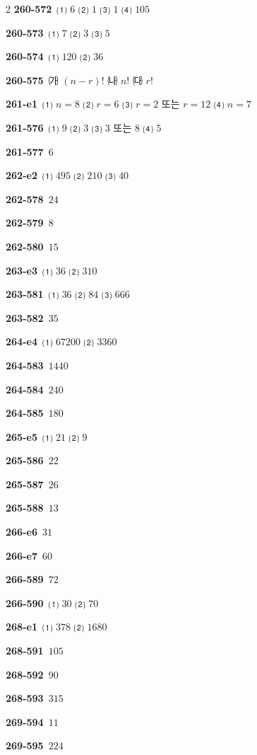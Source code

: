 \documentclass[10pt,a4paper]{article}
\begin{document}
\begin{multicols}{2}
\noindent\textbf{260-572}\ ⑴ $6$ ⑵ $1$ ⑶ $1$ ⑷ $105$\par
\noindent\textbf{260-573}\ ⑴ $7$ ⑵ $3$ ⑶ $5$\par
\noindent\textbf{260-574}\ ⑴ $120$ ⑵ $36$\par
\noindent\textbf{260-575}\ ㈎ $(n-r)!$ ㈏ $n!$ ㈐ $r!$\par
\noindent\textbf{261-e1}\ ⑴ $n=8$ ⑵ $r=6$ ⑶ $r=2$ 또는 $r=12$ ⑷ $n=7$\par
\noindent\textbf{261-576}\ ⑴ $9$ ⑵ $3$ ⑶ $3$ 또는 $8$ ⑷ $5$\par
\noindent\textbf{261-577}\ $6$\par
\noindent\textbf{262-e2}\ ⑴ $495$ ⑵ $210$ ⑶ $40$\par
\noindent\textbf{262-578}\ $24$\par
\noindent\textbf{262-579}\ $8$\par
\noindent\textbf{262-580}\ $15$\par
\noindent\textbf{263-e3}\ ⑴ $36$ ⑵ $310$\par
\noindent\textbf{263-581}\ ⑴ $36$ ⑵ $84$ ⑶ $666$\par
\noindent\textbf{263-582}\ $35$\par
\noindent\textbf{264-e4}\ ⑴ $67200$ ⑵ $3360$\par
\noindent\textbf{264-583}\ $1440$\par
\noindent\textbf{264-584}\ $240$\par
\noindent\textbf{264-585}\ $180$\par
\noindent\textbf{265-e5}\ ⑴ $21$ ⑵ $9$\par
\noindent\textbf{265-586}\ $22$\par
\noindent\textbf{265-587}\ $26$\par
\noindent\textbf{265-588}\ $13$\par
\noindent\textbf{266-e6}\ $31$\par
\noindent\textbf{266-e7}\ $60$\par
\noindent\textbf{266-589}\ $72$\par
\noindent\textbf{266-590}\ ⑴ $30$ ⑵ $70$\par
\noindent\textbf{268-e1}\ ⑴ $378$ ⑵ $1680$\par
\noindent\textbf{268-591}\ $105$\par
\noindent\textbf{268-592}\ $90$\par
\noindent\textbf{268-593}\ $315$\par
\noindent\textbf{269-594}\ $11$\par
\noindent\textbf{269-595}\ $224$\par

\end{multicols}
\end{document}
